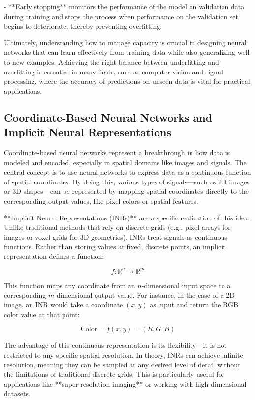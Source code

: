 - **Early stopping** monitors the performance of the model on validation data during training and stops the process when performance on the validation set begins to deteriorate, thereby preventing overfitting.

Ultimately, understanding how to manage capacity is crucial in designing neural networks that can learn effectively from training data while also generalizing well to new examples. Achieving the right balance between underfitting and overfitting is essential in many fields, such as computer vision and signal processing, where the accuracy of predictions on unseen data is vital for practical applications.


\subsection{Coordinate-Based Neural Networks and Implicit Neural Representations}

Coordinate-based neural networks represent a breakthrough in how data is modeled and encoded, especially in spatial domains like images and signals. The central concept is to use neural networks to express data as a continuous function of spatial coordinates. By doing this, various types of signals—such as 2D images or 3D shapes—can be represented by mapping spatial coordinates directly to the corresponding output values, like pixel colors or spatial features.

**Implicit Neural Representations (INRs)** are a specific realization of this idea. Unlike traditional methods that rely on discrete grids (e.g., pixel arrays for images or voxel grids for 3D geometries), INRs treat signals as continuous functions. Rather than storing values at fixed, discrete points, an implicit representation defines a function:

\[
f: \mathbb{R}^n \to \mathbb{R}^m
\]

This function maps any coordinate from an \(n\)-dimensional input space to a corresponding \(m\)-dimensional output value. For instance, in the case of a 2D image, an INR would take a coordinate \((x, y)\) as input and return the RGB color value at that point:

\[
\text{Color} = f(x, y) = (R, G, B)
\]

The advantage of this continuous representation is its flexibility—it is not restricted to any specific spatial resolution. In theory, INRs can achieve infinite resolution, meaning they can be sampled at any desired level of detail without the limitations of traditional discrete grids. This is particularly useful for applications like **super-resolution imaging** or working with high-dimensional datasets.

